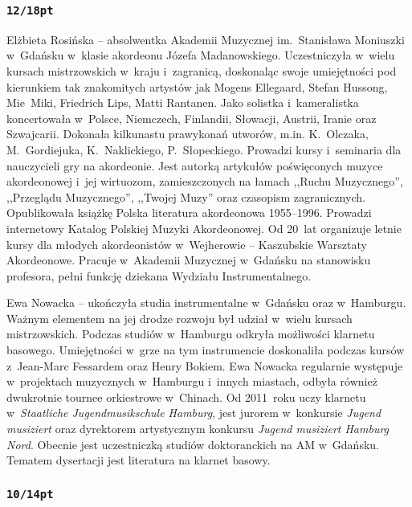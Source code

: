\documentclass[twoside,a4page]{article}
\begin{document}
\subsubsection*{\tt 12/18pt}
\fontsize{12pt}{18pt}\selectfont

Elżbieta Rosińska – absolwentka Akademii Muzycznej im.~Stanisława
Moniuszki w~Gdańsku w~klasie akordeonu Józefa
Madanowskiego. Uczestniczyła w~wielu kursach mistrzowskich w~kraju
i~zagranicą, doskonaląc swoje umiejętności pod kierunkiem tak
znakomitych artystów jak Mogens Ellegaard, Stefan Hussong, Mie~Miki,
Friedrich Lips, Matti Rantanen. Jako solistka i~kameralistka
koncertowała w~Polsce, Niemczech, Finlandii, Słowacji, Austrii,
Iranie oraz Szwajcarii. Dokonała kilkunastu prawykonań utworów, m.in.
K.~Olczaka, M.~Gordiejuka, K.~Naklickiego, P.~Słopeckiego. Prowadzi kursy
i~seminaria dla nauczycieli gry na akordeonie. Jest autorką artykułów
poświęconych muzyce akordeonowej i~jej wirtuozom, zamieszczonych na
łamach ,,Ruchu Muzycznego'', ,,Przeglądu Muzycznego'', ,,Twojej Muzy''
oraz czasopism zagranicznych. Opublikowała książkę Polska literatura
akordeonowa 1955–1996. Prowadzi internetowy Katalog Polskiej Muzyki
Akordeonowej. Od 20~lat organizuje letnie kursy dla młodych
akordeonistów w~Wejherowie – Kaszubskie Warsztaty Akordeonowe. Pracuje
w~Akademii Muzycznej w~Gdańsku na stanowisku profesora, pełni funkcję
dziekana Wydziału Instrumentalnego.


Ewa Nowacka – ukończyła studia instrumentalne w~Gdańsku oraz
w~Hamburgu. Ważnym elementem na jej drodze rozwoju był udział w~wielu
kursach mistrzowskich. Podczas studiów w~Hamburgu odkryła możliwości
klarnetu basowego.  Umiejętności w~grze na tym instrumencie
doskonaliła podczas kursów z~Jean-Marc Fessardem oraz Henry
Bokiem. Ewa Nowacka regularnie występuje w~projektach muzycznych
w~Hamburgu i~innych miastach, odbyła również dwukrotnie tournee
orkiestrowe w~Chinach. Od 2011~roku uczy klarnetu w~\emph{Staatliche
Jugendmusikschule Hamburg}, jest jurorem w~konkursie \emph{Jugend musiziert\/}
oraz dyrektorem artystycznym konkursu \emph{Jugend musiziert Hamburg
  Nord}. Obecnie jest uczestniczką studiów doktoranckich na AM
w~Gdańsku. Tematem dysertacji jest literatura na klarnet basowy.

\subsubsection*{\tt 10/14pt}
\end{document}

